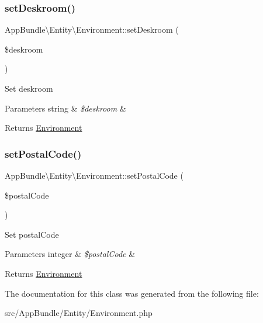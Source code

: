 \subsubsection{\texorpdfstring{set\+Deskroom()}{setDeskroom()}}
{\footnotesize\ttfamily App\+Bundle\textbackslash{}\+Entity\textbackslash{}\+Environment\+::set\+Deskroom (\begin{DoxyParamCaption}\item[{}]{\$deskroom }\end{DoxyParamCaption})}

Set deskroom


\begin{DoxyParams}[1]{Parameters}
string & {\em \$deskroom} & \\
\hline
\end{DoxyParams}
\begin{DoxyReturn}{Returns}
\mbox{\hyperlink{class_app_bundle_1_1_entity_1_1_environment}{Environment}} 
\end{DoxyReturn}
\mbox{\label{class_app_bundle_1_1_entity_1_1_environment_a8993cc1bedd743e58c3eed6b23347fe7}} 
\subsubsection{\texorpdfstring{set\+Postal\+Code()}{setPostalCode()}}
{\footnotesize\ttfamily App\+Bundle\textbackslash{}\+Entity\textbackslash{}\+Environment\+::set\+Postal\+Code (\begin{DoxyParamCaption}\item[{}]{\$postal\+Code }\end{DoxyParamCaption})}

Set postal\+Code


\begin{DoxyParams}[1]{Parameters}
integer & {\em \$postal\+Code} & \\
\hline
\end{DoxyParams}
\begin{DoxyReturn}{Returns}
\mbox{\hyperlink{class_app_bundle_1_1_entity_1_1_environment}{Environment}} 
\end{DoxyReturn}


The documentation for this class was generated from the following file\+:\begin{DoxyCompactItemize}
\item 
src/\+App\+Bundle/\+Entity/Environment.\+php\end{DoxyCompactItemize}
